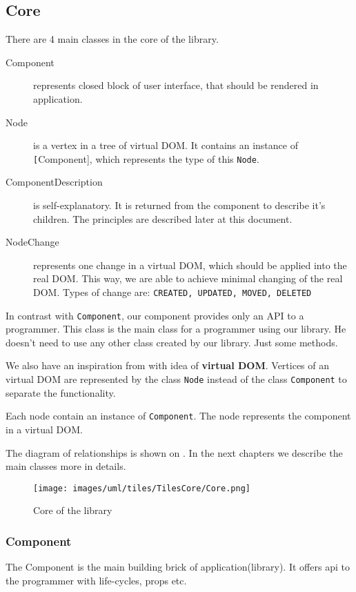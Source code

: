   \subsection{Core}\label{subsec:our-architecture-core}
    There are 4 main classes in the core of the library.
    \begin{description}
      \item[Component] 
        represents closed block of user interface, 
        that should be rendered in application.
      \item[Node]
        is a vertex in a tree of virtual DOM. 
        It contains an instance of \texttt[Component], which represents the type of this \texttt{Node}.
      \item[ComponentDescription]
        is self-explanatory. 
        It is returned from the component to describe it's children. 
        The principles are described later at this document.
      \item[NodeChange]
        represents one change in a virtual DOM, which should be applied into the real DOM. 
        This way, we are able to achieve minimal changing of the real DOM. 
        Types of change are: \texttt{CREATED, UPDATED, MOVED, DELETED}
    \end{description}

    In contrast with \facebook \react \texttt{Component}, our component provides only an API to a programmer.
    This class is the main class for a programmer using our library. 
    He doesn't need to use any other class created by our library. 
    Just some methods.

    We also have an inspiration from \react with idea of \textbf{virtual DOM}. 
    Vertices of an virtual DOM are represented by the class \texttt{Node} instead of the class \texttt{Component} to separate the functionality. 

    Each node contain an instance of \texttt{Component}. 
    The node represents the component in a virtual DOM.
    
    The diagram of relationships is shown on . 
    In the next chapters we describe the main classes more in details.
    \begin{figure}[h]
    \centering  
      \texttt{[image: images/uml/tiles/TilesCore/Core.png]}
      \caption{Core of the library}
      \label{img:library-core}
    \end{figure}

    \subsubsection{Component}\label{subsubsec:our-architecture-core-component}
      The Component is the main building brick of application(library). 
      It offers api to the programmer with life-cycles, props etc. 

